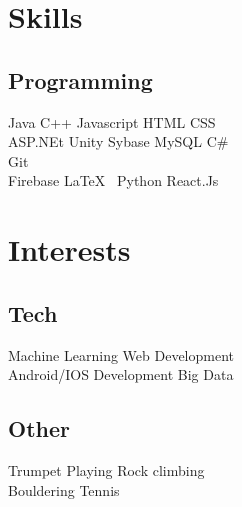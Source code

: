 \documentclass[]{Resume_template}
\begin{document}
\begin{minipage}[t]{0.33\textwidth}

\section{Skills}
\subsection{Programming}
Java \textbullet{} C++ \textbullet{} Javascript \textbullet{}
HTML \textbullet{} CSS \\ 
ASP.NEt \textbullet{} Unity \textbullet{} Sybase \textbullet{} MySQL \textbullet{} C\# \\ Git\\
Firebase  \textbullet{} \LaTeX\ \textbullet{} Python \textbullet{} React.Js
\sectionsep


\section{Interests}
\subsection{Tech}
Machine Learning \textbullet{} Web Development \\ Android/IOS Development \textbullet{} Big Data
\subsection{Other}
Trumpet Playing \textbullet{} Rock climbing \\ Bouldering \textbullet{} Tennis

%
%

\end{minipage} 
\hfill
\end{document}
